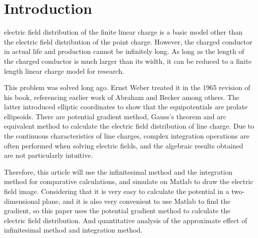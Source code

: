 \documentclass[journal,twocolumn,letterpaper]{IEEEJERM}
\begin{document}
 
%
\IEEEpeerreviewmaketitle


\section{Introduction}
% 
% 
% 
% 
 electric field distribution of the finite linear charge is a basic model other than the electric field distribution of the point charge. However, the charged conductor in actual life and production cannot be infinitely long. As long as the length of the charged conductor is much larger than its width, it can be reduced to a finite length linear charge model for research.

This problem was solved long ago. Ernst Weber treated it in the 1965 revision\cite{num1} of his book, referencing earlier work of Abraham and Becker\cite{num2} among others. The latter introduced elliptic coordinates to show that the equipotentials are prolate ellipsoids.
There are potential gradient method, Gauss's theorem and arc equivalent method to calculate the electric field distribution of line charge. Due to the continuous characteristics of line charges, complex integration operations are often performed when solving electric fields, and the algebraic results obtained are not particularly intuitive. 

Therefore, this article will use the infinitesimal method and the integration method for comparative calculations, and simulate on Matlab to draw the electric field image. Considering that it is very easy to calculate the potential in a two-dimensional plane, and it is also very convenient to use Matlab to find the gradient, so this paper uses the potential gradient method to calculate the electric field distribution. And quantitative analysis of the approximate effect of infinitesimal method and integration method.
\end{document}
